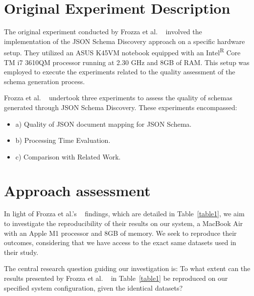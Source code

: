 \documentclass[sigconf, nonacm]{acmart}
\begin{document}
\section{Original Experiment Description}

The original experiment conducted by Frozza et al. ~\cite{frozza2018approach} involved the implementation of the JSON Schema Discovery approach on a specific hardware setup. They utilized an ASUS K45VM notebook equipped with an Intel\textsuperscript{R} Core TM i7 3610QM processor running at 2.30 GHz and 8GB of RAM. This setup was employed to execute the experiments related to the quality assessment of the schema generation process.

Frozza et al. ~\cite{frozza2018approach} undertook three experiments to assess the quality of schemas generated through JSON Schema Discovery. These experiments encompassed:

\begin{itemize}
    \item a) Quality of JSON document mapping for JSON Schema.
    \item b) Processing Time Evaluation.
    \item c) Comparison with Related Work.
\end{itemize}

\section{Approach assessment}

In light of Frozza et al.'s ~\cite{frozza2018approach} findings, which are detailed in Table~\ref{table1}, we aim to investigate the reproducibility of their results on our system, a MacBook Air with an Apple M1 processor and 8GB of memory. We seek to reproduce their outcomes, considering that we have access to the exact same datasets used in their study.

The central research question guiding our investigation is: To what extent can the results presented by Frozza et al. ~\cite{frozza2018approach} in Table~\ref{table1} be reproduced on our specified system configuration, given the identical datasets?
\end{document}
